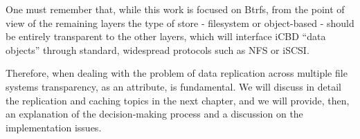 One must remember that, while this work is focused on Btrfs, from the point of view of the remaining
layers the type of store - filesystem or object-based - should be entirely transparent to the other layers, which will interface iCBD “data objects” through standard, widespread protocols such as NFS or iSCSI. 

Therefore, when dealing with the problem of data replication across multiple file systems transparency, as an attribute, is fundamental. We will discuss in detail the replication and caching topics in the next chapter, and we will provide, then, an explanation of the decision-making process and a discussion on the implementation issues.






